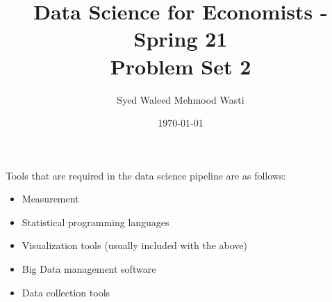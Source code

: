 \documentclass[11pt]{article}
\title{\textbf{Data Science for Economists - Spring 21 \\
\vspace{0.5cm}
Problem Set 2}}
\author{Syed Waleed Mehmood Wasti}
\date{\today}
\begin{document}
\begin{titlepage}
\maketitle
\thispagestyle{empty}
\end{titlepage}



Tools that are required in the data science pipeline are as follows: \\

\begin{itemize}
    \item 
    Measurement
    \item
    Statistical programming languages
    \item
    Visualization tools (usually included with the above)
    \item
    Big Data management software
    \item
    Data collection tools

   

    
\end{itemize}
\end{document}
